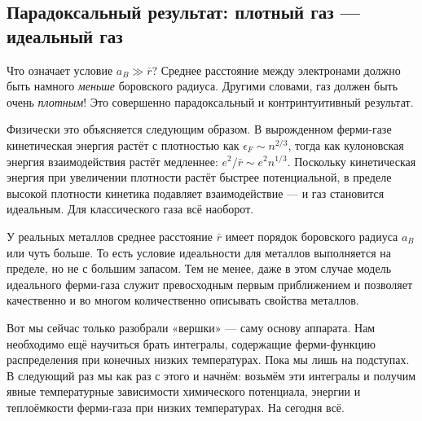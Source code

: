 \documentclass[../general/general]{subfiles}
\begin{document}
\subsection{Парадоксальный результат: плотный газ — идеальный газ}

Что означает условие $a_B \gg \bar{r}$? Среднее расстояние между электронами должно быть намного \emph{меньше} боровского радиуса. Другими словами, газ должен быть очень \emph{плотным}! Это совершенно парадоксальный и контринтуитивный результат.

Физически это объясняется следующим образом. В вырожденном ферми-газе кинетическая энергия растёт с плотностью как $\epsilon_F \sim n^{2/3}$, тогда как кулоновская энергия взаимодействия растёт медленнее: $e^2/\bar{r} \sim e^2 n^{1/3}$. Поскольку кинетическая энергия при увеличении плотности растёт быстрее потенциальной, в пределе высокой плотности кинетика подавляет взаимодействие — и газ становится идеальным. Для классического газа всё наоборот.

У реальных металлов среднее расстояние $\bar{r}$ имеет порядок боровского радиуса $a_B$ или чуть больше. То есть условие идеальности для металлов выполняется на пределе, но не с большим запасом. Тем не менее, даже в этом случае модель идеального ферми-газа служит превосходным первым приближением и позволяет качественно и во многом количественно описывать свойства металлов.

Вот мы сейчас только разобрали «вершки» — саму основу аппарата. Нам необходимо ещё научиться брать интегралы, содержащие ферми-функцию распределения при конечных низких температурах. Пока мы лишь на подступах. В следующий раз мы как раз с этого и начнём: возьмём эти интегралы и получим явные температурные зависимости химического потенциала, энергии и теплоёмкости ферми-газа при низких температурах. На сегодня всё.

\end{document}
